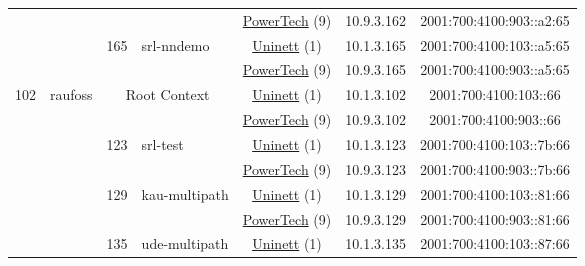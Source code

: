 \begin{small}
\begin{center}
\begin{longtable}{|c|c|c|c|c|c|c|c|}
  &  &  &  & \multicolumn{2}{|c|}{\tiny{\href{http://www.powertech.no}{PowerTech} (9)}} & \tiny{10.9.3.162} & \tiny{2001:700:4100:903::a2:65} \\* \cline{3-3}\cline{4-4}\cline{5-5}\cline{6-6}\cline{7-7}\cline{8-8}
  &  & \multirow{2}{*}{\tiny{165}} & \multicolumn{1}{|l|}{\multirow{2}{*}{\tiny{srl-nndemo}}} & \multicolumn{2}{|c|}{\tiny{\href{https://www.uninett.no}{Uninett} (1)}} & \tiny{10.1.3.165} & \tiny{2001:700:4100:103::a5:65} \\* \cline{5-5}\cline{6-6}\cline{7-7}\cline{8-8}
  &  &  &  & \multicolumn{2}{|c|}{\tiny{\href{http://www.powertech.no}{PowerTech} (9)}} & \tiny{10.9.3.165} & \tiny{2001:700:4100:903::a5:65} \\ \hline
 \multirow{18}{*}{\tiny{102}} & \multicolumn{1}{|l|}{\multirow{18}{*}{\tiny{raufoss}}} & \multicolumn{2}{|c|}{\multirow{2}{*}{\tiny{Root Context}}} & \multicolumn{2}{|c|}{\tiny{\href{https://www.uninett.no}{Uninett} (1)}} & \tiny{10.1.3.102} & \tiny{2001:700:4100:103::66} \\* \cline{5-5}\cline{6-6}\cline{7-7}\cline{8-8}
  &  & \multicolumn{2}{|c|}{} & \multicolumn{2}{|c|}{\tiny{\href{http://www.powertech.no}{PowerTech} (9)}} & \tiny{10.9.3.102} & \tiny{2001:700:4100:903::66} \\* \cline{3-3}\cline{4-4}\cline{5-5}\cline{6-6}\cline{7-7}\cline{8-8}
  &  & \multirow{2}{*}{\tiny{123}} & \multicolumn{1}{|l|}{\multirow{2}{*}{\tiny{srl-test}}} & \multicolumn{2}{|c|}{\tiny{\href{https://www.uninett.no}{Uninett} (1)}} & \tiny{10.1.3.123} & \tiny{2001:700:4100:103::7b:66} \\* \cline{5-5}\cline{6-6}\cline{7-7}\cline{8-8}
  &  &  &  & \multicolumn{2}{|c|}{\tiny{\href{http://www.powertech.no}{PowerTech} (9)}} & \tiny{10.9.3.123} & \tiny{2001:700:4100:903::7b:66} \\* \cline{3-3}\cline{4-4}\cline{5-5}\cline{6-6}\cline{7-7}\cline{8-8}
  &  & \multirow{2}{*}{\tiny{129}} & \multicolumn{1}{|l|}{\multirow{2}{*}{\tiny{kau-multipath}}} & \multicolumn{2}{|c|}{\tiny{\href{https://www.uninett.no}{Uninett} (1)}} & \tiny{10.1.3.129} & \tiny{2001:700:4100:103::81:66} \\* \cline{5-5}\cline{6-6}\cline{7-7}\cline{8-8}
  &  &  &  & \multicolumn{2}{|c|}{\tiny{\href{http://www.powertech.no}{PowerTech} (9)}} & \tiny{10.9.3.129} & \tiny{2001:700:4100:903::81:66} \\* \cline{3-3}\cline{4-4}\cline{5-5}\cline{6-6}\cline{7-7}\cline{8-8}
  &  & \multirow{2}{*}{\tiny{135}} & \multicolumn{1}{|l|}{\multirow{2}{*}{\tiny{ude-multipath}}} & \multicolumn{2}{|c|}{\tiny{\href{https://www.uninett.no}{Uninett} (1)}} & \tiny{10.1.3.135} & \tiny{2001:700:4100:103::87:66} \\* \cline{5-5}\cline{6-6}\cline{7-7}\cline{8-8}

\end{longtable}
\end{center}
\end{small}
